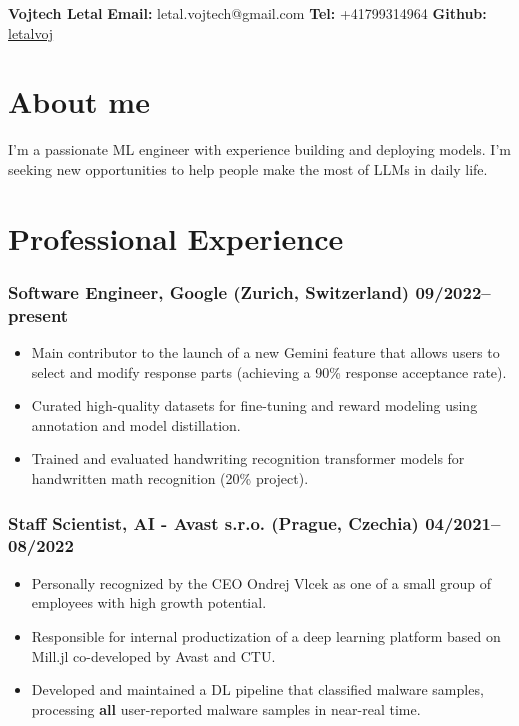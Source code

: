 \documentclass[10pt]{article}
\begin{document}
\clearpage
\thispagestyle{empty}
{\center\bfseries\huge Vojtech Letal}
\hfill
{\bf Email:} letal.vojtech@gmail.com
{\bf Tel:} +41799314964
{\bf Github:} \href{http://github.com/letalvoj}{letalvoj}

\section*{About me}
I'm a passionate ML engineer with experience building and deploying models. I'm seeking new opportunities to help people make the most of LLMs in daily life.

\section*{Professional Experience}
\subsubsection*{\bf Software Engineer, Google (Zurich, Switzerland) \hfill 09/2022--present}
    \begin{itemize}
        \setlength\itemsep{-0.25em}
        \item Main contributor to the launch of a new Gemini feature that allows users to select and modify response parts (achieving a 90\% response acceptance rate).
        \item Curated high-quality datasets for fine-tuning and reward modeling using annotation and model distillation.
        \item Trained and evaluated handwriting recognition transformer models for handwritten math recognition (20\% project).
    \end{itemize}

\subsubsection*{\bf Staff Scientist, AI - Avast s.r.o. (Prague, Czechia) \hfill 04/2021--08/2022}
	 \begin{itemize}
		\setlength\itemsep{-0.25em}
		\item Personally recognized by the CEO Ondrej Vlcek as one of a small group of employees with high growth potential.
		\item Responsible for internal productization of a deep learning platform based on Mill.jl co-developed by Avast and CTU.
		\item Developed and maintained a DL pipeline that classified malware samples, processing \textbf{all} user-reported malware samples in near-real time.
	 \end{itemize}
\end{document}
